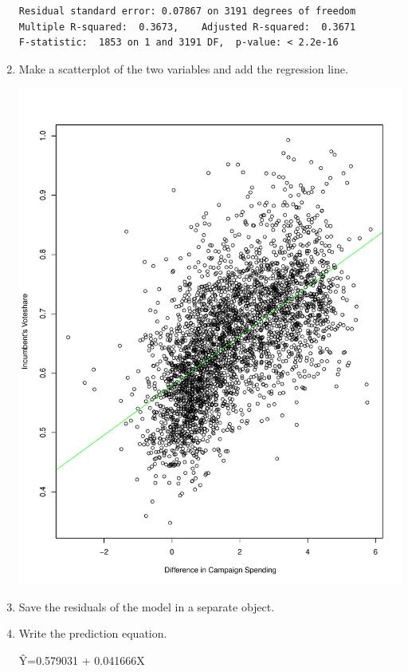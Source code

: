 \documentclass[12pt,letterpaper]{article}
\begin{document}
\begin{enumerate}
\begin{Verbatim}
Residual standard error: 0.07867 on 3191 degrees of freedom
Multiple R-squared:  0.3673,	Adjusted R-squared:  0.3671 
F-statistic:  1853 on 1 and 3191 DF,  p-value: < 2.2e-16
		\end{Verbatim}
		\item Make a scatterplot of the two variables and add the regression line.
		
		\includegraphics[scale=0.6]{Question 1.2.pdf}
		\item Save the residuals of the model in a separate object.
				
		\item Write the prediction equation.
		
		\^{Y}=0.579031 + 0.041666X
	\end{enumerate}
	
\newpage
\end{document}
